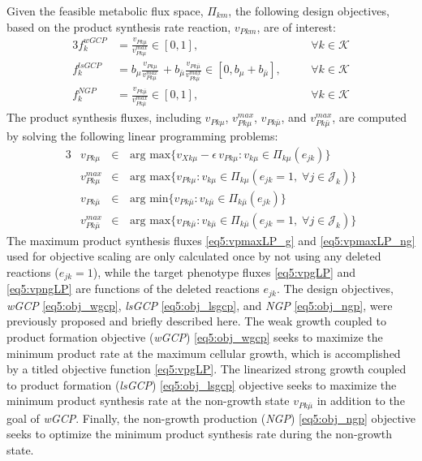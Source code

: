 Given the feasible metabolic flux space, $\Pi_{km}$, the following design objectives, based on the product synthesis rate reaction, $v_{Pkm}$, are of interest:
\begin{alignat}{3}
	f_k^{wGCP} & =\frac{v_{Pk\mu}}{v_{Pk\mu}^{max}}\in[0,1], \qquad & & \forall k\in \mathcal{K} \label{eq5:obj_wgcp}\\
	f_k^{lsGCP} & =b_{\mu} \frac{v_{Pk \mu}}{v_{Pk\mu}^{max}} \, + b_{\bar{\mu}} \frac{v_{Pk \bar{\mu}}}{v_{Pk\bar{\mu}}^{max}} \in[0,b_{\mu}+b_{\bar{\mu}}], \quad  & &  \forall k\in \mathcal{K} \label{eq5:obj_lsgcp}\\
	f_k^{NGP} & = \frac{v_{Pk \bar{\mu}}}{v_{Pk\bar{\mu}}^{max}} \in[0,1], \qquad  & &  \forall k\in \mathcal{K} \label{eq5:obj_ngp}
\end{alignat}
\noindent
The product synthesis fluxes, including $v_{Pk\mu}$, $v_{Pk\mu}^{max}$, $v_{Pk\bar{\mu}}$, and $v_{Pk\bar{\mu}}^{max}$, are computed by solving the following linear programming problems:
\begin{alignat}{3}
& v_{Pk\mu} 	&\in& \,	\text{arg }	\underset{}{\text{max}} \{v_{Xk\mu}-\epsilon \, v_{Pk\mu} : v_{k\mu}\in \Pi_{k\mu}(e_{jk})	\} \label{eq5:vpgLP}	\\
& v_{P k\mu}^{max} &\in& \,	\text{arg }	\underset{}{\text{max}} \{v_{Pk \mu} : v_{k \mu} \in \Pi_{k \mu} (e_{jk} = 1, \; \forall j\in \mathcal{J}_k) 	\}   \label{eq5:vpmaxLP_g}	\\
& v_{Pk \bar{\mu}} 	&\in& \,	\text{arg }	\underset{}{\text{min}} \{v_{Pk \bar{\mu}} : v_{k \bar{\mu}} \in \Pi_{k \bar{\mu}}(e_{jk})\} \label{eq5:vpngLP} \\
& v_{Pk\bar{\mu}}^{max} &\in& \,	 \text{arg }	\underset{}{\text{max}} \{v_{Pk \bar{\mu}} : v_{k \bar{\mu}} \in \Pi_{k \bar{\mu}}(e_{jk} = 1, \; \forall j\in \mathcal{J}_k)\}  \label{eq5:vpmaxLP_ng}
\end{alignat}
\noindent
The maximum product synthesis fluxes \eqref{eq5:vpmaxLP_g} and \eqref{eq5:vpmaxLP_ng} used for objective scaling are only calculated once by not using any deleted reactions ($e_{jk}=1$), while the target phenotype fluxes \eqref{eq5:vpgLP} and \eqref{eq5:vpngLP} are functions of the deleted reactions $e_{jk}$. The design objectives, \textit{wGCP} \eqref{eq5:obj_wgcp}, \textit{lsGCP} \eqref{eq5:obj_lsgcp}, and \textit{NGP} \eqref{eq5:obj_ngp}, were previously proposed \citep{garcia2019} and briefly described here. The weak growth coupled to product formation objective (\textit{wGCP}) \eqref{eq5:obj_wgcp} seeks to maximize the minimum product rate at the maximum cellular growth, which is accomplished by a titled objective function\citep{feist2010} \eqref{eq5:vpgLP}. The linearized strong growth coupled to product formation (\textit{lsGCP}) \eqref{eq5:obj_lsgcp} objective seeks to maximize the minimum product synthesis rate at the non-growth state $v_{Pk\bar{\mu}}$ in addition to the goal of \textit{wGCP}. Finally, the non-growth production (\textit{NGP}) \eqref{eq5:obj_ngp} objective seeks to optimize the minimum product synthesis rate during the non-growth state.


